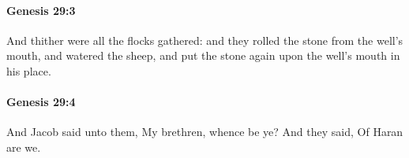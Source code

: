 		\paragraph{Genesis 29:3} %
			\label{GENESIS-29-3}

			And thither were all the flocks gathered: and they rolled the stone from the well's mouth, and watered the sheep, and put the stone again upon the well's mouth in his place.


		\paragraph{Genesis 29:4} %
			\label{GENESIS-29-4}

			And Jacob said unto them, My brethren, whence be ye? And they said, Of Haran are we.


